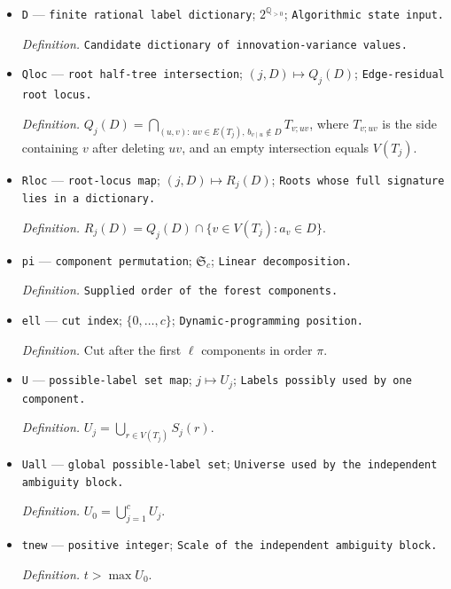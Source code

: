 \documentclass{article}
\begin{document}
\begin{itemize}
  \par\smallskip\noindent\emph{Definition.} \(\mathcal F_K(\Sigma)=\{\rho:|L(\rho)|\le K\}\).
  \item \texttt{D} --- \texttt{finite rational label dictionary}; \(2^{\mathbb Q_{>0}}\); \texttt{Algorithmic state input.}
  \par\smallskip\noindent\emph{Definition.} \texttt{Candidate dictionary of innovation-\allowbreak{}variance values.}
  \item \texttt{Qloc} --- \texttt{root half-\allowbreak{}tree intersection}; \((j,D)\mapsto Q_j(D)\); \texttt{Edge-\allowbreak{}residual root locus.}
  \par\smallskip\noindent\emph{Definition.} \(Q_j(D)=\bigcap_{(u,v):\,uv\in E(T_j),\,b_{v\mid u}\notin D}T_{v;uv}\), where \(T_{v;uv}\) is the side containing \(v\) after deleting \(uv\), and an empty intersection equals \(V(T_j)\).
  \item \texttt{Rloc} --- \texttt{root-\allowbreak{}locus map}; \((j,D)\mapsto R_j(D)\); \texttt{Roots whose full signature lies in a dictionary.}
  \par\smallskip\noindent\emph{Definition.} \(R_j(D)=Q_j(D)\cap\{v\in V(T_j):a_v\in D\}\).
  \item \texttt{pi} --- \texttt{component permutation}; \(\mathfrak S_c\); \texttt{Linear decomposition.}
  \par\smallskip\noindent\emph{Definition.} \texttt{Supplied order of the forest components.}
  \item \texttt{ell} --- \texttt{cut index}; \(\{0,\ldots,c\}\); \texttt{Dynamic-\allowbreak{}programming position.}
  \par\smallskip\noindent\emph{Definition.} Cut after the first \(\ell\) components in order \(\pi\).
  \item \texttt{U} --- \texttt{possible-\allowbreak{}label set map}; \(j\mapsto U_j\); \texttt{Labels possibly used by one component.}
  \par\smallskip\noindent\emph{Definition.} \(U_j=\bigcup_{r\in V(T_j)}S_j(r)\).
  \item \texttt{Uall} --- \texttt{global possible-\allowbreak{}label set}; \texttt{Universe used by the independent ambiguity block.}
  \par\smallskip\noindent\emph{Definition.} \(U_0=\bigcup_{j=1}^{c}U_j\).
  \item \texttt{tnew} --- \texttt{positive integer}; \texttt{Scale of the independent ambiguity block.}
  \par\smallskip\noindent\emph{Definition.} \(t>\max U_0\).

\end{itemize}
\end{document}
